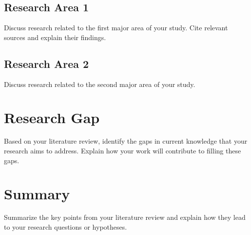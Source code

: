 \subsection{Research Area 1}

Discuss research related to the first major area of your study. Cite relevant sources and explain their findings.

\subsection{Research Area 2}

Discuss research related to the second major area of your study.

\section{Research Gap}

Based on your literature review, identify the gaps in current knowledge that your research aims to address. Explain how your work will contribute to filling these gaps.

\section{Summary}

Summarize the key points from your literature review and explain how they lead to your research questions or hypotheses.

